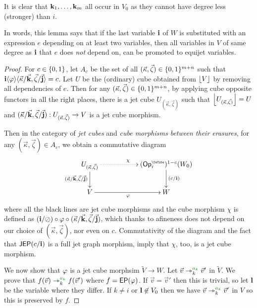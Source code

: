 \documentclass[a4paper]{memoir}
\begin{document}
It is clear that $\mathbf{k}_1, \ldots, \mathbf{k}_m$ all occur in $V_0$ as they cannot have degree less (stronger) than $i$.

In words, this lemma says that if the last variable $\mathbf{i}$ of $W$ is substituted with an expression $e$ depending on at least two variables, then all variables in $V$ of same degree as $\mathbf{i}$ that $e$ does \emph{not} depend on, can be promoted to equijet variables.
\begin{proof}
	For $c \in \mathopen{}\left\{ 0, 1 \right\}\mathclose{}$, let $A_c$ be the set of all $(\vec \kappa, \vec \zeta) \in \mathopen{}\left\{ 0, 1 \right\}\mathclose{}^{m+n}$ such that $\mathbf{i} \langle \varphi \rangle \langle \vec \kappa / \vec{\mathbf{k}}, \vec \zeta / \vec{\mathbf{j}} \rangle = c$.
	Let $U$ be the (ordinary) cube obtained from $\mathopen{}\left\lfloor V \right\rfloor\mathclose{}$ by removing all dependencies of $e$.
	Then for any $(\vec \kappa, \vec \zeta) \in \mathopen{}\left\{ 0, 1 \right\}\mathclose{}^{m+n}$, by applying cube opposite functors in all the right places, there is a jet cube $U_{(\vec \kappa, \vec \zeta)}$ such that $\mathopen{}\left\lfloor U_{(\vec \kappa, \vec \zeta)} \right\rfloor\mathclose{} = U$ and $(\vec \kappa / \vec{\mathbf{k}}, \vec \zeta / \vec{\mathbf{j}}) : U_{(\vec \kappa, \vec \zeta)} \to V$ is a jet cube morphism.
	
	Then in the category of \emph{jet cubes} and \emph{cube morphisms between their erasures}, for any $(\vec \kappa, \vec \zeta) \in A_c$, we obtain a commutative diagram
	\[
		\xymatrix{
			U_{(\vec \kappa, \vec \zeta)}
				\ar[d]_{(\vec \kappa / \vec{\dm k}, \vec \zeta / \vec{\dm j})}
				\ar@{.>}[rr]^\chi
			&&
			(\Opcube_i)^{1-c}(W_0)
				\ar[d]^{(c/\dm i)}
			\\
			V
				\ar[rr]_{\vfi}
			&&
			W
		}
	\]
	where all the black lines are jet cube morphisms and the cube morphism $\chi$ is defined as $(\mathbf{i} / \oslash) \circ \varphi \circ (\vec \kappa / \vec{\mathbf{k}}, \vec \zeta / \vec{\mathbf{j}})$, which thanks to afineness does not depend on our choice of $(\vec \kappa, \vec \zeta)$, nor even on $c$.
	Commutativity of the diagram and the fact that $\mathsf{JEP}(c/\mathbf{i})$ is a full jet graph morphism, imply that $\chi$, too, is a jet cube morphism.
	
	We now show that $\varphi$ is a jet cube morphsim $\tilde V \to W$.
	Let $\vec v \jet_k\pmr{a_k} \vec v'$ in $\tilde V$.
	We prove that $f(\vec v) \jet_k\pmr{a_k} f(\vec v')$ where $f = \mathsf{EP}(\varphi)$.
	If $\vec v = \vec v'$ then this is trivial, so let $\mathbf{l}$ be the variable where they differ.
	If $k \neq i$ or $\mathbf{l} \not\in V_0$ then we have $\vec v \jet_k\pmr{a_k} \vec v'$ in $V$ so this is preserved by $f$.
	

\end{proof}
\end{document}
